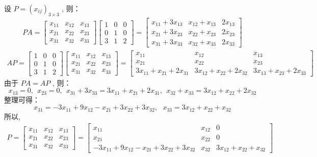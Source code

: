 \documentclass[11pt,a4paper,openany,oneside]{book}
\begin{document}
设 $ P = (x_{ij})_{3\times3} $ , 则：
\begin{gather*}
PA = 
\begin{bmatrix}
x_{11} & x_{12} & x_{13} \\
x_{21} & x_{22} & x_{23} \\
x_{31} & x_{32} & x_{33} 
\end{bmatrix} 
\begin{bmatrix}
1 & 0 & 0 \\
0 & 1 & 0 \\
3 & 1 & 2 
\end{bmatrix}
=
\begin{bmatrix}
x_{11} + 3x_{13} & x_{12} + x_{13} & 2x_{13} \\
x_{21} + 3x_{23} & x_{22} + x_{23} & 2x_{23} \\
x_{31} + 3x_{33} & x_{32} + x_{33} & 2x_{33}
\end{bmatrix}
\end{gather*}
\begin{gather*}
AP = 
\begin{bmatrix}
1 & 0 & 0 \\
0 & 1 & 0 \\
3 & 1 & 2 
\end{bmatrix}
\begin{bmatrix}
x_{11} & x_{12} & x_{13} \\
x_{21} & x_{22} & x_{23} \\
x_{31} & x_{32} & x_{33} 
\end{bmatrix} 
=
\begin{bmatrix}
x_{11} & x_{12} & x_{13} \\
x_{21} & x_{22} & x_{23} \\
3x_{11} + x_{21} + 2x_{31} & 3x_{12} + x_{22} + 2x_{32} & 3x_{13} + x_{23} + 2x_{33}
\end{bmatrix}
\end{gather*}
由于 $ PA = AP $ , 则：
 $$  x_{13} = 0, \ \ x_{23} = 0, \ \ x_{31}+3x_{33} = 3x_{11} + x_{21} + 2x_{31}, \ \ x_{32} + x_{33} = 3x_{12} + x_{22} + 2x_{32}  $$ 
整理可得：
 $$  x_{31} = -3x_{11} +  9x_{12} -x_{21} + 3x_{22} + 3x_{32}, \ \ \ x_{33} = 3x_{12} + x_{22} + x_{32}  $$ 
所以, 
\begin{gather*}
P = 
\begin{bmatrix}
x_{11} & x_{12} & x_{13} \\
x_{21} & x_{22} & x_{23}\\
x_{31} & x_{32} & x_{33}
\end{bmatrix}
=
\begin{bmatrix}
x_{11} & x_{12} & 0 \\
x_{21} & x_{22} & 0\\
-3x_{11} +  9x_{12} -x_{21} + 3x_{22} + 3x_{32} & x_{32} & 3x_{12} + x_{22} + x_{32}
\end{bmatrix} 
\end{gather*}
\end{document}
